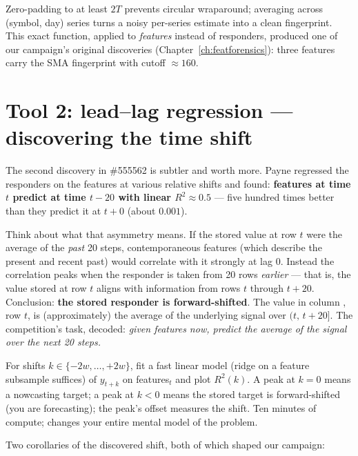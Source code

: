 Zero-padding to at least $2T$ prevents circular wraparound; averaging across
(symbol, day) series turns a noisy per-series estimate into a clean
fingerprint. This exact function, applied to \emph{features} instead of
responders, produced one of our campaign's original discoveries
(Chapter~\ref{ch:featforensics}): three features carry the SMA fingerprint
with cutoff $\approx 160$.

\section{Tool 2: lead--lag regression --- discovering the time shift}
\label{sec:shift}

The second discovery in \#555562 is subtler and worth more. Payne regressed
the responders on the features at various relative shifts and found:
\textbf{features at time $t$ predict  at time $t-20$ with linear
$R^2 \approx 0.5$} --- five hundred times better than they predict it at
$t+0$ (about $0.001$).

Think about what that asymmetry means. If the stored value at row $t$ were
the average of the \emph{past} 20 steps, contemporaneous features (which
describe the present and recent past) would correlate with it strongly at
lag 0. Instead the correlation peaks when the responder is taken from 20
rows \emph{earlier} --- that is, the value stored at row $t$ aligns with
information from rows $t$ through $t+20$. Conclusion: \textbf{the stored
responder is forward-shifted}. The value in column , row $t$, is
(approximately) the average of the underlying signal over $(t,\, t+20]$.
The competition's task, decoded: \emph{given features now, predict the
average of the signal over the next 20 steps.}

\begin{keybox}
For shifts $k \in \{-2w, \dots, +2w\}$, fit a fast linear model (ridge on a
feature subsample suffices) of $y_{t+k}$ on features$_t$ and plot $R^2(k)$.
A peak at $k=0$ means a nowcasting target; a peak at $k<0$ means the stored
target is forward-shifted (you are forecasting); the peak's offset measures
the shift. Ten minutes of compute; changes your entire mental model of the
problem.
\end{keybox}

Two corollaries of the discovered shift, both of which shaped our campaign:

